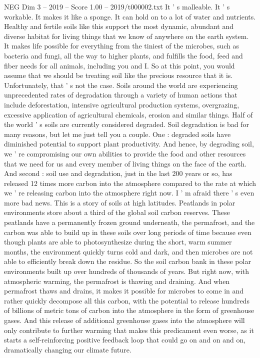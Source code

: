 \begin{textsample}{NEG Dim 3 – 2019 – Score 1.00 – 2019/t000002.txt}
It ' s malleable.
It ' s workable.
It makes it like a sponge.
It can hold on to a lot of water and nutrients.
Healthy and fertile soils like this support the most dynamic, abundant and diverse habitat for living things that we know of anywhere on the earth system.
It makes life possible for everything from the tiniest of the microbes, such as bacteria and fungi, all the way to higher plants, and fulfills the food, feed and fiber needs for all animals, including you and I.
So at this point, you would assume that we should be treating soil like the precious resource that it is.
Unfortunately, that ' s not the case.
Soils around the world are experiencing unprecedented rates of degradation through a variety of human actions that include deforestation, intensive agricultural production systems, overgrazing, excessive application of agricultural chemicals, erosion and similar things.
Half of the world ' s soils are currently considered degraded.
Soil degradation is bad for many reasons, but let me just tell you a couple.
One : degraded soils have diminished potential to support plant productivity.
And hence, by degrading soil, we ' re compromising our own abilities to provide the food and other resources that we need for us and every member of living things on the face of the earth.
And second : soil use and degradation, just in the last 200 years or so, has released 12 times more carbon into the atmosphere compared to the rate at which we ' re releasing carbon into the atmosphere right now.
I ' m afraid there ' s even more bad news.
This is a story of soils at high latitudes.
Peatlands in polar environments store about a third of the global soil carbon reserves.
These peatlands have a permanently frozen ground underneath, the permafrost, and the carbon was able to build up in these soils over long periods of time because even though plants are able to photosynthesize during the short, warm summer months, the environment quickly turns cold and dark, and then microbes are not able to efficiently break down the residue.
So the soil carbon bank in these polar environments built up over hundreds of thousands of years.
But right now, with atmospheric warming, the permafrost is thawing and draining.
And when permafrost thaws and drains, it makes it possible for microbes to come in and rather quickly decompose all this carbon, with the potential to release hundreds of billions of metric tons of carbon into the atmosphere in the form of greenhouse gases.
And this release of additional greenhouse gases into the atmosphere will only contribute to further warming that makes this predicament even worse, as it starts a self-reinforcing positive feedback loop that could go on and on and on, dramatically changing our climate future.

\end{textsample}
